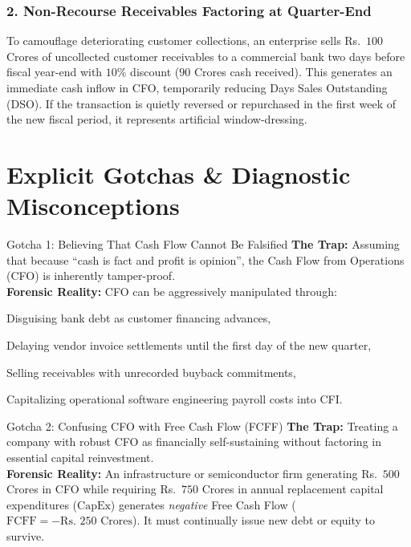 \subsubsection{2. Non-Recourse Receivables Factoring at Quarter-End}
To camouflage deteriorating customer collections, an enterprise sells Rs.~$100$ Crores of uncollected customer receivables to a commercial bank two days before fiscal year-end with $10\%$ discount ($90$ Crores cash received). This generates an immediate cash inflow in CFO, temporarily reducing Days Sales Outstanding (DSO). If the transaction is quietly reversed or repurchased in the first week of the new fiscal period, it represents artificial window-dressing.

\section{Explicit Gotchas \& Diagnostic Misconceptions}

\begin{trapbox}{Gotcha 1: Believing That Cash Flow Cannot Be Falsified}
\textbf{The Trap:} Assuming that because ``cash is fact and profit is opinion'', the Cash Flow from Operations (CFO) is inherently tamper-proof.\\
\textbf{Forensic Reality:} CFO can be aggressively manipulated through:
\begin{enumerate*}[label=(\roman*)]
    \item Disguising bank debt as customer financing advances,
    \item Delaying vendor invoice settlements until the first day of the new quarter,
    \item Selling receivables with unrecorded buyback commitments,
    \item Capitalizing operational software engineering payroll costs into CFI.
\end{enumerate*}
\end{trapbox}

\begin{trapbox}{Gotcha 2: Confusing CFO with Free Cash Flow (FCFF)}
\textbf{The Trap:} Treating a company with robust CFO as financially self-sustaining without factoring in essential capital reinvestment.\\
\textbf{Forensic Reality:} An infrastructure or semiconductor firm generating Rs.~$500$ Crores in CFO while requiring Rs.~$750$ Crores in annual replacement capital expenditures ($\text{CapEx}$) generates \textit{negative} Free Cash Flow ($\text{FCFF} = -\text{Rs.~}250\text{ Crores}$). It must continually issue new debt or equity to survive.
\end{trapbox}

